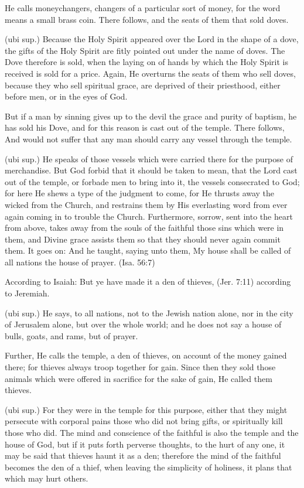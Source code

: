  He calls moneychangers, changers of a particular sort of money, for the word means a small brass coin. There follows, and the seats of them that sold doves.

 (ubi sup.) Because the Holy Spirit appeared over the Lord in the shape of a dove, the gifts of the Holy Spirit are fitly pointed out under the name of doves. The Dove therefore is sold, when the laying on of hands by which the Holy Spirit is received is sold for a price. Again, He overturns the seats of them who sell doves, because they who sell spiritual grace, are deprived of their priesthood, either before men, or in the eyes of God.

 But if a man by sinning gives up to the devil the grace and purity of baptism, he has sold his Dove, and for this reason is cast out of the temple. There follows, And would not suffer that any man should carry any vessel through the temple.

 (ubi sup.) He speaks of those vessels which were carried there for the purpose of merchandise. But God forbid that it should be taken to mean, that the Lord cast out of the temple, or forbade men to bring into it, the vessels consecrated to God; for here He shews a type of the judgment to come, for He thrusts away the wicked from the Church, and restrains them by His everlasting word from ever again coming in to trouble the Church. Furthermore, sorrow, sent into the heart from above, takes away from the souls of the faithful those sins which were in them, and Divine grace assists them so that they should never again commit them. It goes on: And he taught, saying unto them, My house shall be called of all nations the house of prayer. (Isa. 56:7)

 According to Isaiah: But ye have made it a den of thieves, (Jer. 7:11) according to Jeremiah.

 (ubi sup.) He says, to all nations, not to the Jewish nation alone, nor in the city of Jerusalem alone, but over the whole world; and he does not say a house of bulls, goats, and rams, but of prayer.

 Further, He calls the temple, a den of thieves, on account of the money gained there; for thieves always troop together for gain. Since then they sold those animals which were offered in sacrifice for the sake of gain, He called them thieves.

 (ubi sup.) For they were in the temple for this purpose, either that they might persecute with corporal pains those who did not bring gifts, or spiritually kill those who did. The mind and conscience of the faithful is also the temple and the house of God, but if it puts forth perverse thoughts, to the hurt of any one, it may be said that thieves haunt it as a den; therefore the mind of the faithful becomes the den of a thief, when leaving the simplicity of holiness, it plans that which may hurt others.

